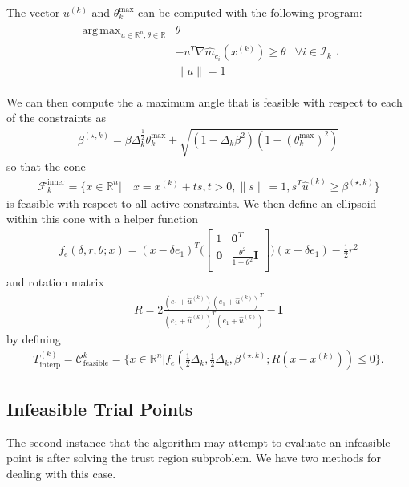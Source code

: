 \documentclass{article}
\theoremstyle{case}
\newcommand{\xk}{{x^{(k)}}}
\newcommand{\Rn}{\mathbb R^n}
\newcommand{\reals}{\mathbb R}
\newcommand{\dk}{\Delta_k}
\newcommand{\sampletrk}{{T_{\text{interp}}^{(k)}}}
\newcommand{\uk}{{u^{(k)}}}
\DeclareMathOperator*{\argmax}{arg\,max}
\newcommand{\unshiftedcone}{{\mathcal C^k_{\text{feasible}}}}
\newcommand{\iik}{{\mathcal I_{k}}}
\newcommand{\huk}{{{\hat u}^{(k)}}}
\newcommand{\bsk}{{\beta^{(\star, k)}}}
\newcommand{\fcki}{{\mathcal {F}^{\text{inner}}_k}}
\newcommand{\rn}{{\mathbb R^{n}}}
\newcommand{\hgmcik}{{\nabla \hat m_{c_i}(\xk)}}
\begin{document}
The vector $\uk$ and $\theta^{\text{max}}_k$ can be computed with the following program:
\begin{align*}
\begin{array}{ccc}
\argmax_{u\in\Rn, \theta\in\reals} & \theta \\
& -u^T \hgmcik \ge \theta & \forall i \in \iik\\
& \|u \| = 1& 
\end{array}.
\end{align*}

We can then compute the a maximum angle that is feasible with respect to each of the constraints as
\begin{align}
\bsk = \beta\dk^{\frac 1 2} \theta^{\text{max}}_k + \sqrt{(1 - \dk\beta^2)\left(1 - (\theta^{\text{max}}_k) ^2\right)} \label{def_bs_k}
\end{align}
so that the cone
\begin{align}
\fcki = \{x \in \rn | \quad x = \xk + ts, t > 0, \|s\| = 1, s^T\huk \ge \bsk \} \label{feasible_cone}
\end{align}
is feasible with respect to all active constraints.
We then define an ellipsoid within this cone with a helper function
\begin{align}
f_e(\delta, r, \theta; x) = (x - \delta e_1)^T\bigg(\begin{bmatrix}
1 & \boldsymbol0^T \\
\boldsymbol 0 & \frac{\theta^2}{1 - \theta^2} \boldsymbol I \\
\end{bmatrix}\bigg)(x - \delta e_1) - \frac 1 2 r^2 \label{def_ellipse_function}
\end{align}
and rotation matrix
\begin{align}
R = 2\frac{(e_1 + \huk)(e_1 + \huk)^T}{(e_1 + \huk)^T(e_1 + \huk)} - \boldsymbol I \label{def_rotation}
\end{align}
by defining
\begin{align}
\sampletrk = \unshiftedcone = \{x \in \rn | f_e\left(\frac 1 2 \dk, \frac 1 2 \dk, \bsk; R(x - \xk)\right) \le 0\}. \label{def_ellipse_k}
\end{align}

\subsection{Infeasible Trial Points}
\label{convex_model_reduction}

The second instance that the algorithm may attempt to evaluate an infeasible point is after solving the trust region subproblem.
We have two methods for dealing with this case.
\end{document}
